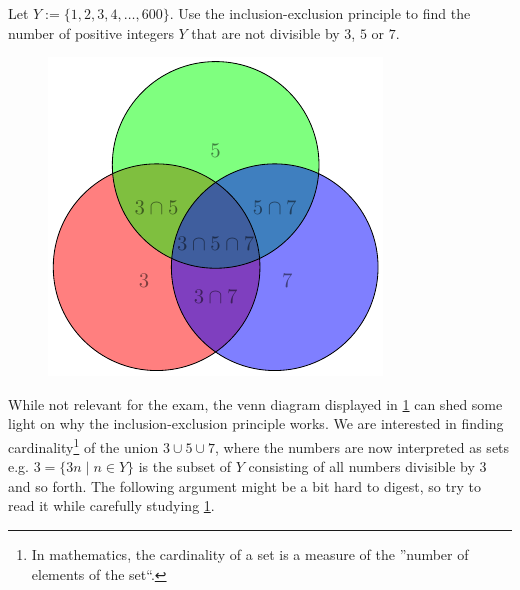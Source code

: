 \documentclass[a4paper, english, 12pt]{article} %
\begin{document}
\titlebox

\begin{problem}[2]
  Let $Y := \{ 1,2,3,4,\ldots,600 \}$. Use the inclusion-exclusion principle to
  find the number of positive integers $Y$ that are not divisible by $3$, $5$ or $7$.
\end{problem}


\begin{answer}
\begin{figure}[htbp!]
  \centering
  \includegraphics{Venn-Diagram-5}
  \caption{}
  \label{fig:venn}
\end{figure}

  While not relevant for the exam, the venn diagram displayed in \cref{fig:venn}
  can shed some light on why the inclusion-exclusion principle works. We are
  interested in finding cardinality\footnote{In mathematics, the cardinality of
    a set is a measure of the ''number of elements of the set``.} of the union $3 \cup 5 \cup 7$, where the numbers are now
  interpreted as sets e.g. $3 = \{3n \mid n \in Y\}$ is the subset of $Y$
  consisting of all numbers divisible by 3 and so forth. The following argument
  might be a bit hard to digest, so try to read it while carefully studying \cref{fig:venn}.


\end{answer}
\end{document}
